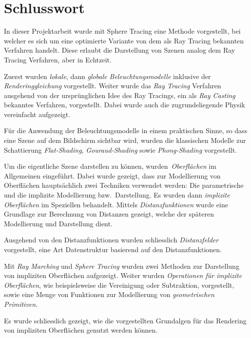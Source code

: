 
\chapter{Schlusswort}
\label{chap:discussion_and_conclusion}

In dieser Projektarbeit wurde mit Sphere Tracing eine Methode
vorgestellt, bei welcher es sich um eine optimierte Variante von dem als
Ray Tracing bekannten Verfahren handelt. Diese erlaubt die Darstellung
von Szenen analog dem Ray Tracing Verfahren, aber in Echtzeit.

Zuerst wurden \textit{lokale}, dann \textit{globale Beleuchtungsmodelle} inklusive der
\textit{Renderinggleichung} vorgestellt. Weiter wurde das \textit{Ray Tracing}
Verfahren ausgehend von der ursprünglichen Idee des Ray Tracings, ein
als \textit{Ray Casting} bekanntes Verfahren, vorgestellt. Dabei wurde auch die
zugrundeliegende Physik vereinfacht aufgezeigt.

Für die Anwendung der Beleuchtungsmodelle in einem praktischen Sinne, so
dass eine Szene auf dem Bildschirm sichtbar wird, wurden die klassischen
Modelle zur Schattierung \textit{Flat-Shading}, \textit{Gouraud-Shading}
sowie \textit{Phong-Shading} vorgestellt.

Um die eigentliche Szene darstellen zu können,
wurden~\textit{Oberflächen} im Allgemeinen eingeführt. Dabei wurde
gezeigt, dass zur Modellierung von Oberflächen hauptsächlich zwei
Techniken verwendet werden: Die parametrische und die
implizite Modellierung bzw.\ Darstellung. Es wurden dann
\textit{implizite Oberflächen} im Speziellen behandelt. Mittels
\textit{Distanzfunktionen} wurde eine Grundlage zur Berechnung von
Distanzen gezeigt, welche der späteren Modellierung und Darstellung dient.

Ausgehend von den Distanzfunktionen wurden schliesslich
\textit{Distanzfelder} vorgestellt, eine Art Datenstruktur basierend auf
den Distanzfunktionen.

Mit \textit{Ray Marching} und \textit{Sphere Tracing} wurden zwei Methoden
zur Darstellung von impliziten Oberflächen aufgezeigt. Weiter wurden
\textit{Operationen für implizite Oberflächen}, wie beispielsweise die
Vereinigung oder Subtraktion, vorgestellt, sowie eine Menge von
Funktionen zur Modellierung von \textit{geometrischen Primitiven}.

Es wurde schliesslich gezeigt, wie die vorgestellten Grundalgen für das
Rendering von impliziten Oberflächen genutzt werden können.

